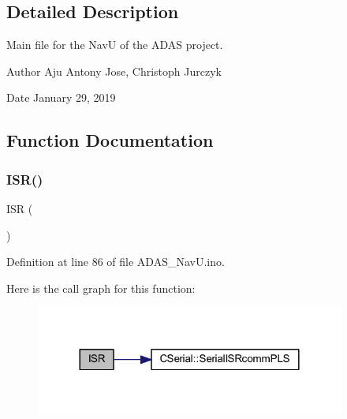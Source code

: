 \subsection{Detailed Description}
Main file for the NavU of the A\+D\+AS project. 

\begin{DoxyAuthor}{Author}
Aju Antony Jose, Christoph Jurczyk 
\end{DoxyAuthor}
\begin{DoxyDate}{Date}
January 29, 2019 
\end{DoxyDate}


\subsection{Function Documentation}
\mbox{\label{_a_d_a_s___nav_u_8ino_ae6e8a8009a9ae0c59f25a496d1cf5a84}} 
\subsubsection{\texorpdfstring{I\+S\+R()}{ISR()}\hspace{0.1cm}{\footnotesize\ttfamily [1/2]}}
{\footnotesize\ttfamily I\+SR (\begin{DoxyParamCaption}\item[{U\+S\+A\+R\+T1\+\_\+\+R\+X\+\_\+vect}]{ }\end{DoxyParamCaption})}



Definition at line 86 of file A\+D\+A\+S\+\_\+\+Nav\+U.\+ino.

Here is the call graph for this function\+:\nopagebreak
\begin{figure}[H]
\begin{center}
\leavevmode
\includegraphics[width=288pt]{_a_d_a_s___nav_u_8ino_ae6e8a8009a9ae0c59f25a496d1cf5a84_cgraph}
\end{center}
\end{figure}
\mbox{\label{_a_d_a_s___nav_u_8ino_a63a86aad9ba2e355fe6380da553f554e}} 
